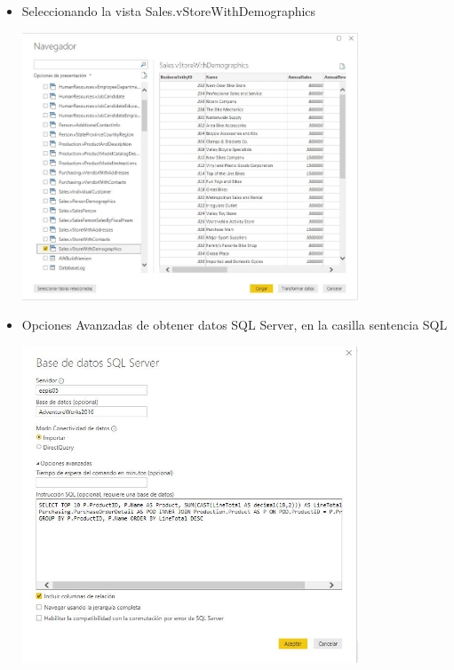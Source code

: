 \begin{itemize}
	\item Seleccionando la vista Sales.vStoreWithDemographics
	\begin{center}
	\includegraphics[width=10cm]{./Imagenes/Captura3} 
	\end{center}
\end{itemize} 

\begin{itemize}
	\item Opciones Avanzadas de obtener datos SQL Server, en la casilla sentencia SQL
	\begin{center}
	\includegraphics[width=10cm]{./Imagenes/Captura4} 
	\end{center}
\end{itemize} 

